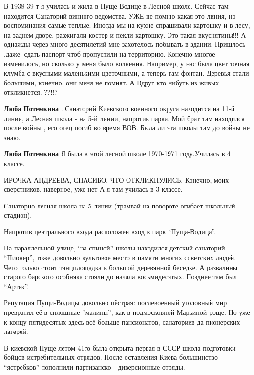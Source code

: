 \begin{itemize}

В 1938-39 т я училась и жила в Пуще Водице в Лесной школе. Сейчас там находится
Санаторий винного ведомства. УЖЕ не помню какая это линия, но воспоминания самые
теплые. Иногда мы на кухне спрашивали картошку и в лесу, на заднем дворе,
разжигали костер и пекли картошку. Это такая вкуснятины!!! А однажды через много
десятилетий мне захотелось побывать в здании. Пришлось ,даже, сдать паспорт
чтоб пропустили на территорию. Конечно многое изменилось, но сколько у меня было
волнения. Например, у нас была цвет точная клумба с вкусными маленькими
цветочными, а теперь там фонтан. Деревья стали большими, конечно, они меня не
помнят. А Вдруг кто нибуть из живых откликнется. ??!!?

\begin{itemize} %
\textbf{Люба Потемкина} . Санаторий Киевского военного округа находится на 11-й линии, а Лесная школа - на 5-й линии, напротив парка. Мой брат там находился после войны , его отец погиб во время ВОВ. Была ли эта школы там до войны не знаю.

\textbf{Люба Потемкина} Я была в этой лесной школе 1970-1971 году.Училась в 4 классе.

ИРОЧКА АНДРЕЕВА, СПАСИБО, ЧТО ОТКЛИКНУЛИСЬ. Конечно, моих сверстников, наверное, уже нет А я там училась в 3 классе.


Санаторно-лесная школа на 5 линии (трамвай на повороте огибает школьный стадион).

Напротив центрального входа расположен вход в парк \enquote{Пуща-Водица}.

На параллельной улице, \enquote{за спиной} школы находился детский санаторий \enquote{Пионер},
тоже довольно культовое место в памяти многих советских людей. Чего только
стоит танцплощадка в большой деревянной беседке. А развалины старого барского
особняка стояли до начала восьмидесятых. Позднее там был \enquote{Артек}.

Репутация Пущи-Водицы довольно пёстрая: послевоенный уголовный мир превратил её
в сплошные \enquote{малины}, как в подмосковной Марьиной роще. Но уже к концу
пятидесятых здесь всё больше пансионатов, санаториев да пионерских лагерей.

В киевской Пуще летом 41го была открыта первая в СССР школа подготовки бойцов
истребительных отрядов. После оставления Киева большинство \enquote{ястребков}
пополнили партизанско - диверсионные отряды.


\end{itemize}
\end{itemize}

